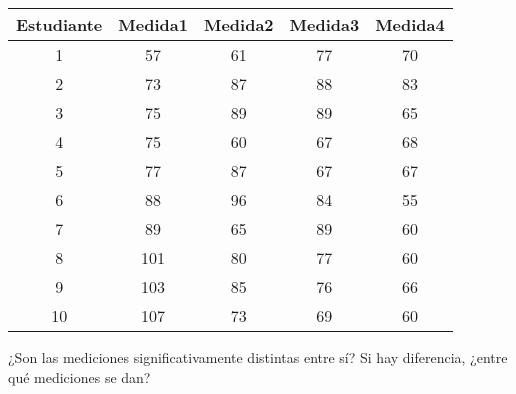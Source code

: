 \begin{enumerate}[leftmargin=*]
\begin{center}
\begin{tabular}{ccccc}
\hline
Estudiante & Medida1 & Medida2 & Medida3 & Medida4 \\
\hline
1 & 57 & 61 & 77 & 70 \\
2 & 73 & 87 & 88 & 83 \\
3 & 75 & 89 & 89 & 65 \\
4 & 75 & 60 & 67 & 68 \\
5 & 77 & 87 & 67 & 67 \\
6 & 88 & 96 & 84 & 55 \\
7 & 89 & 65 & 89 & 60 \\
8 & 101 & 80 & 77 & 60 \\
9 & 103 & 85 & 76 & 66 \\
10 & 107 & 73 & 69 & 60 \\
\hline
\end{tabular}
\end{center}

¿Son las mediciones significativamente distintas entre sí? 
Si hay diferencia, ¿entre qué mediciones se dan?
\end{enumerate}

